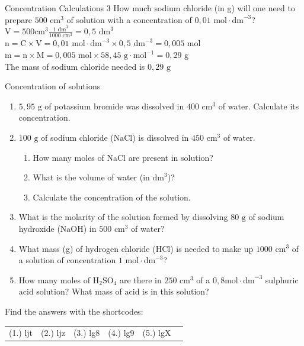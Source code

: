       \begin{wex}{Concentration Calculations 3 }
{
\label{m38712*id283476}How much sodium chloride (in g) will one need to prepare $500 {\text{ cm}}^{3}$ of solution with a concentration of $0,01 \text{ mol} \cdot \text{dm}^{-3}$?
   }
{
$\text{V}= 500 \text{cm}^{3} \frac{1 \text{ dm}^{3}}{1 000 \text{ cm}^{3}}=0,5 {\text{ dm}}^{3}$
$\text{n}=\text{C} \times \text{V}= 0,01 \text{ mol} \cdot \text{dm}^{-3} \times 0,5 \text{ dm}^{-3} = 0,005 \text{ mol}$
$\text{m}=\text{n} \times \text{M}= 0,005 \text{ mol} \times 58,45 \text{ g} \cdot \text{mol}^{-1} = 0,29 \text{ g}$\\
The mass of sodium chloride needed is $0,29 \text{ g}$ 
}
    \end{wex}
    \noindent
\label{m38712*secfhsst!!!underscore!!!id1879}
            \begin{exercises}{ Concentration of solutions
      }
            \nopagebreak \noindent
      \label{m38712*id283713}\begin{enumerate}[noitemsep, label=\textbf{\arabic*}. ] 
\item $5,95 \text{ g}$ of potassium bromide was dissolved in $400 {\text{ cm}}^{3}$ of water. Calculate its concentration.
\item $100 \text{ g}$ of sodium chloride ($\text{NaCl}$) is dissolved in $450 {\text{ cm}}^{3}$ of water.
  \begin{enumerate}[noitemsep, label=\textbf{\alph*}. ] 
    \item How many moles of NaCl are present in solution?
    \item What is the volume of water (in ${\text{dm}}^{3}$)?
    \item Calculate the concentration of the solution.
\end{enumerate}
\item What is the molarity of the solution formed by dissolving $80 \text{ g}$ of sodium hydroxide ($\text{NaOH}$) in $500 {\text{ cm}}^{3}$ of water? 
\item What mass (g) of hydrogen chloride ($\text{HCl}$) is needed to make up $1000 {\text{ cm}}^{3}$ of a solution of concentration $1 \text{ mol} \cdot {\text{dm}}^{-3}$?
\item How many moles of $\text{H}{}_{2}\text{SO}{}_{4}$ are there in $250 {\text{ cm}}^{3}$ of a $0,8 \text{mol} \cdot \text{dm}^{-3}$ sulphuric acid solution? What mass of acid is in this solution?
\end{enumerate}
\practiceinfo
\par {} Find the answers with the shortcodes:
 \par \begin{tabular}[h]{cccccc}
 (1.) ljt  &  (2.) ljz  &  (3.) lg8  &  (4.) lg9  &  (5.) lgX  & \end{tabular}
\end{exercises}
